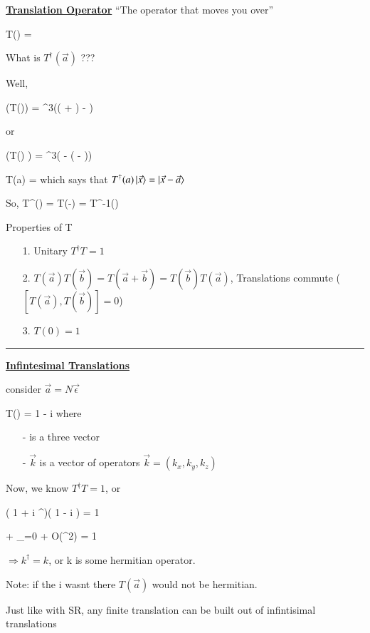 {\textbf{\underline{Translation Operator}}
``The operator that moves you over''

\be
T() \ketX = 
\ee


What is $T^\dagger(\vec{a})$ ???

Well, 

\be
{}\left(T()\ketX \right) = \delta^3(( + ) - )
\ee

or 

\be
\left(T() \right) \ketX  = \delta^3( - ( - ))
\ee

\be
\Rightarrow {}T(a) = 
\ee
which says that $T^\dagger(a)\ket{\vec{x}} = \ket{\vec{x}-\vec{a}}$

So, 
\be
T^\dagger() = T(-) = T^{-1}()
\ee

Properties of T
\begin{itemize}
\item[1.] Unitary $T^\dagger T = 1$
\item[2.] $T(\vec{a})T(\vec{b}) = T(\vec{a} + \vec{b}) = T(\vec{b})T(\vec{a})$,  Translations commute ($[T(\vec{a}),T(\vec{b})] = 0$)
\item[3.] $T(0) = 1$
\end{itemize}


\noindent\rule{\textwidth}{1pt}

\textbf{\underline{Infintesimal Translations}}

consider $\vec{a} = N\vec{\epsilon}$



\be
T(\ve) = 1 - i \ve \cdot {}
\ee 
where 
\begin{itemize}
\item[-]\ve is a three vector
\item[-]$\vec{k}$ is a vector of operators $\vec{k} = (k_x, k_y, k_z)$
\end{itemize}

Now, we know $T^\dagger T = 1$, or 

\be
\left( 1 + i \ve \cdot {}^\dagger \right)\left( 1 - i \ve \cdot {} \right) = 1
\ee

 + _{=0} + O(\epsilon^2) = 1
\ee

$\Rightarrow k^\dagger = k$, or k is some hermitian operator.


Note: if the i wasnt there $T(\vec{a})$ would not be hermitian. 

Just like with SR, any finite translation can be built out of infintisimal translations

}
